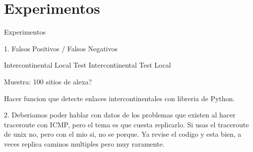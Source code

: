 \section{Experimentos}

Experimentos

1. Falsos Positivos / Falsos Negativos


            Intercontinental     Local
Test Intercontinental
Test Local

Muestra: 100 sitios de alexa?

Hacer funcion que detecte enlaces intercontinentales con libreria de Python.

2. Deberiamos poder hablar con datos de los problemas que existen al hacer traceroute con ICMP, pero el tema es que cuesta replicarlo. Si usas el traceroute de unix no, pero con el mio si, no se porque. Ya revise el codigo y esta bien, a veces replica caminos multiples pero muy raramente.


